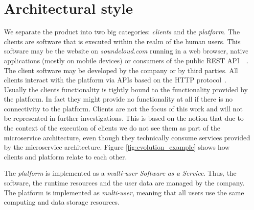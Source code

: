\section{Architectural style}
\label{sec:architecture}

We separate the product into two big categories: \emph{clients} and the \emph{platform}. The clients are software that is executed within the realm of the human users. This software may be the website on \emph{soundcloud.com} running in a web browser, native applications (mostly on mobile devices) or consumers of the public REST API~\cite{soundclouddevelopers}~\cite{Fielding}. The client software may be developed by the company or by third parties. All clients interact with the platform via APIs based on the HTTP protocol~\cite{rfc2616}. Usually the clients functionality is tightly bound to the functionality provided by the platform. In fact they might provide no functionality at all if there is no connectivity to the platform. Clients are not the focus of this work and will not be represented in further investigations. This is based on the notion that due to the context of the execution of clients we do not see them as part of the microservice architecture, even though they technically consume services provided by the microservice architecture. Figure \ref{fig:evolution_example} shows how clients and platform relate to each other.

The \emph{platform} is implemented as a \emph{multi-user} \emph{Software as a Service}. Thus, the software, the runtime resources and the user data are managed by the company. The platform is implemented as \emph{multi-user}, meaning that all users use the same computing and data storage resources.

